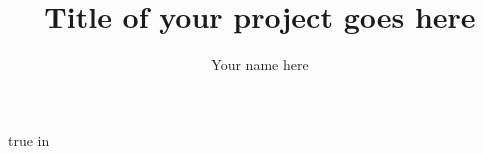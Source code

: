 \documentclass[12pt,letterpaper,final]{report}
\author{Your name here}
\title{Title of your project goes here}
\theoremstyle{definition}
\begin{document}
    \maketitle

    \newpage    
    

    \tableofcontents
    \listoffigures
    \listoftables

     true in

    \newpage

        
                
    
    
    

    \begin{singlespace}
        
        
    \end{singlespace}

    \printglossary   
\end{document}
